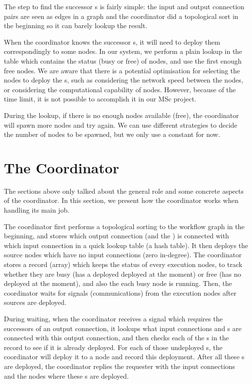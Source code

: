 The step to find the successor \tPEInst{}s is fairly simple: the input and output connection pairs are seen as edges in a graph and the coordinator did a topological sort in the beginning so it can barely lookup the result.

When the coordinator knows the successor \tPEInst{}s, it will need to deploy them correspondingly to some nodes. In our system, we perform a plain lookup in the table which contains the status (busy or free) of nodes, and use the first enough free nodes. We are aware that there is a potential optimisation for selecting the nodes to deploy the \tPEInst{}s, such as considering the network speed between the nodes, or considering the computational capability of nodes. However, because of the time limit, it is not possible to accomplish it in our MSc project.

During the lookup, if there is no enough nodes available (free), the coordinator will spawn more nodes and try again. We can use different strategies to decide the number of nodes to be spawned, but we only use a constant for now.

\section{The Coordinator} \label{sec:incdep_coord}
The sections above only talked about the general role and some concrete aspects of the coordinator. In this section, we present how the coordinator works when handling its main job.

The coordinator first performs a topological sorting to the workflow graph in the beginning, and stores which output connection (and the \tPEInst) is connected with which input connection in a quick lookup table (\eg a hash table). It then deploys the source nodes which have no input connections (\ie zero in-degree). The coordinator stores a record (array) which keeps the status of every execution nodes, to track whether they are busy (has a \tPEInst deployed deployed at the moment) or free (has no \tPEInst deployed at the moment), and also the \tPEInst each busy node is running.
Then, the coordinator waits for signals (\ie communications) from the execution nodes after sources are deployed.

During waiting, when the coordinator receives a signal which requires the successors of an output connection, it lookups what input connections and \tPEInst{}s are connected with this output connection, and then checks each of the \tPEInst{}s in the record to see if it is already deployed. For each of those undeployed \tPEInst{}s, the coordinator will deploy it to a node and record this deployment. After all these \tPEInst{}s are deployed, the coordinator replies the requester with the input connections and the nodes where these \tPEInst{}s are deployed.

